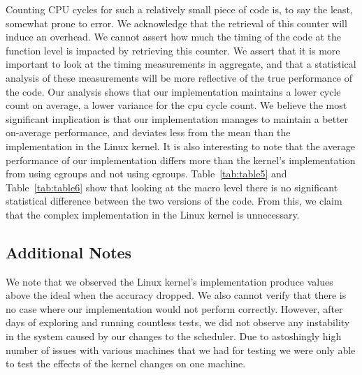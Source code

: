 \documentclass[10pt, conference]{IEEEtran}
\begin{document}
Counting CPU cycles for such a relatively small piece of code is, to say the least, somewhat prone to error.  We acknowledge that the retrieval of this counter will induce an overhead.  We cannot assert how much the timing of the code at the function level is impacted by retrieving this counter.   We assert that it is more important to look at the timing measurements in aggregate, and that a statistical analysis of these measurements will be more reflective of the true performance of the code.  Our analysis shows that our implementation maintains a lower cycle count on average, a lower variance for the cpu cycle count.  We believe the most significant implication is that our implementation manages to maintain a better on-average performance, and deviates less from the mean than the implementation in the Linux kernel.  It is also interesting to note that the average performance of our implementation differs more than the kernel's implementation from using cgroups and not using cgroups.    Table~\ref{tab:table5} and Table~\ref{tab:table6} show that looking at the macro level there is no significant statistical difference between the two versions of the code.  From this, we claim that the complex implementation in the Linux kernel is unnecessary.

\subsection{Additional Notes}
We note that we observed the Linux kernel's implementation produce values above the ideal when the accuracy dropped.  We also cannot verify that there is no case where our implementation would not perform correctly.  However, after days of exploring and running countless tests, we did not observe any instability in the system caused by our changes to the scheduler. Due to astoshingly high number of issues with various machines that we had for testing we were only able to test the effects of the kernel changes on one machine.


\nocite{*}
\end{document}
